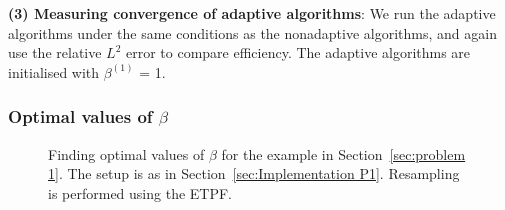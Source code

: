 \documentclass[final]{siamltex}
\begin{document}
{\bf (3) Measuring convergence of adaptive algorithms}: We run the
adaptive algorithms under the same conditions as the nonadaptive
algorithms, and again use the relative $L^2$ error to compare
efficiency. The adaptive algorithms are initialised with $\beta^{(1)}$ = 1.


\subsubsection{Optimal values of $\beta$}\label{sec:Optimal values P1}

\begin{figure}[htb]
\centering
{}
\caption{Finding optimal values of $\beta$ for the example in Section~\ref{sec:problem 1}. The setup is as in Section~\ref{sec:Implementation P1}. Resampling is performed using the ETPF.}
\label{fig:P1 opt beta}
\end{figure}
\end{document}
